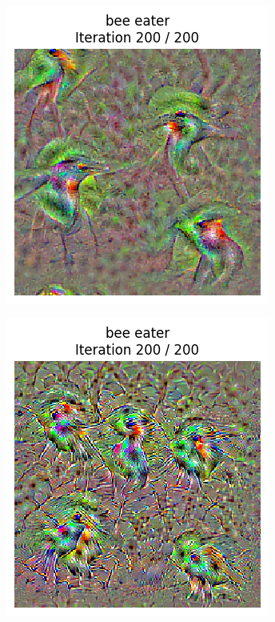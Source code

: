 \begin{figure}[H]
\begin{subfigure}[t]{.33\textwidth}
        \includegraphics[width=\linewidth]{figs_propre2/SqueezeNet/SqueezeNet_bird_animated_blur++_last_frame.png}
        \caption{}
        \label{fig:class_viz_blur:sub2}
    \end{subfigure}%
    \begin{subfigure}[t]{.33\textwidth}
        \centering
        \includegraphics[width=\linewidth]{figs_propre2/SqueezeNet/SqueezeNet_bird_animated_no_blur_last_frame.png}

\end{subfigure}
\end{figure}
